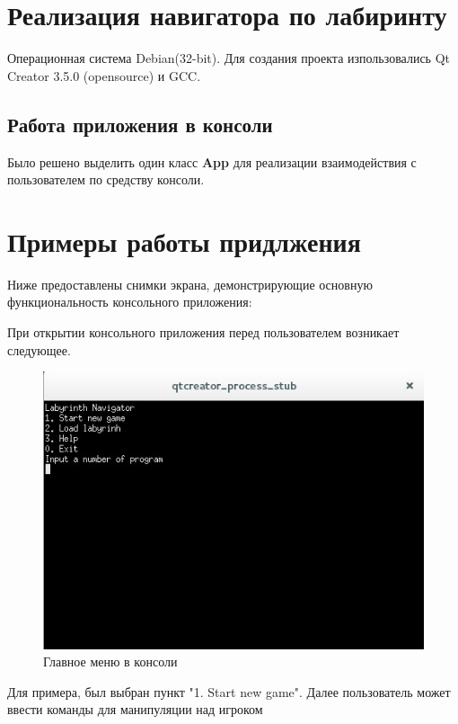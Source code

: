 \documentclass[a4paper]{article}
\begin{document}
\section{Реализация навигатора по лабиринту}
Операционная система Debian(32-bit). Для создания проекта изпользовались Qt Creator 3.5.0 (opensource) и GCC.

\subsection{Работа приложения в консоли}
	Было решено выделить один класс \textbf{App} для реализации взаимодействия с пользователем по средству консоли.
	
\section{Примеры работы придлжения}

Ниже предоставлены снимки экрана, демонстрирующие основную функциональность консольного приложения:

При открытии консольного приложения перед пользователем возникает следующее. 

\begin{figure}[H]
	\begin{center}
		\includegraphics[scale=0.7]{Screenshot/1.jpg}
		\caption{Главное меню в консоли} 
		\label{pic:pic_name} %
	\end{center}
\end{figure}

Для примера, был выбран пункт "1. Start new game". Далее пользователь может ввести команды для манипуляции над игроком
\end{document}
